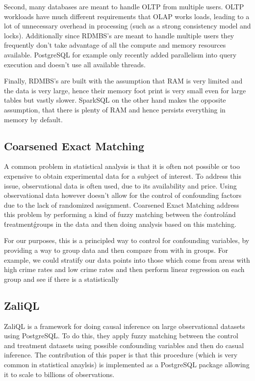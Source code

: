 \documentclass[a4paper]{article}
\begin{document}
		Second, many databases are meant to handle OLTP from multiple users. OLTP workloads have much different 
		requirements that OLAP works loads, leading to a lot of unnecessary overhead in processing (such as 
		a strong consistency model and locks). Additionally since RDMBS's are meant to handle multiple users
		they frequently don't take advantage of all the compute and memory resources available. PostgreSQL for example
		only recently added parallelism into query execution and doesn't use all available threads. 

		Finally, RDMBS's are built with the assumption that RAM is very limited and the data is very large, hence 
		their memory foot print is very small even for large tables but vastly slower. SparkSQL on the other 
		hand makes the opposite assumption, that there is plenty of RAM and hence persists everything in memory
		by default.
		
	\subsection{Coarsened Exact Matching ~\cite{ref:CEM}}
		A common problem in statistical analysis is that it is often not possible or too expensive 
		to obtain experimental data for a subject of interest. To address this issue, observational data is
		often used, due to its availability and price. Using observational data however doesn't allow for 
		the control of confounding factors due to the lack of randomized assignment. Coarsened Exact Matching
		address this problem by performing a kind of fuzzy matching between the \'control\' and \'treatment\' 
		groups in the data and then doing analysis based on this matching. 

		For our purposes, this is a principled way to control for confounding variables, by providing 
		a way to group data and then  compare from with in groups. For example, we could 
		stratify our data points into those which come from areas with high crime rates and low crime rates 
		and then perform linear regression on each group and see if there is a statistically



	\subsection{ZaliQL~\cite{ref:ZaliQL}}
		ZaliQL is a framework for doing causal inference on large observational datasets using PostgreSQL. To do this, they 
		apply fuzzy matching between the control and treatment datasets using possible confounding variables 
		and then do casual inference. The contribution of this paper is that this procedure (which is very common in statistical anaylsis)
		is implemented as a PostgreSQL package allowing it to scale to billions of observations.
	
\end{document}
